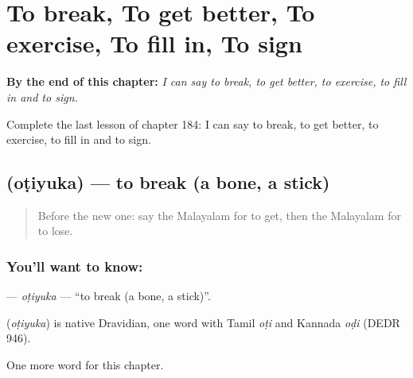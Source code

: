 
\chapter{To break, To get better, To exercise, To fill in, To sign}
\label{ch:ml-to-break-to-get-better-to-exercise-to-fill-in-to-sign}

\begin{chapteropening}
\textbf{By the end of this chapter:} \emph{I can say to break, to get better, to exercise, to fill in and to sign.}

Complete the last lesson of chapter 184: I can say to break, to get better, to exercise, to fill in and to sign.
\end{chapteropening}

\section[\texorpdfstring{\ml{ഒടിയുക} (oṭiyuka)}{ഒടിയുക (oṭiyuka)}]{ (oṭiyuka) — to break (a bone, a stick)}

\label{lesson:ML-C184-otiyuka}



\begin{quote}
Before the new one: say the Malayalam for to get, then the Malayalam for to lose.
\end{quote}

\subsection*{You'll want to know: }
\textbf{} — \emph{oṭiyuka} — \textquotedblleft{}to break (a bone, a stick)\textquotedblright{}.

\begin{cousinweb}
\textbf{} (\emph{oṭiyuka}) is native Dravidian, one word with Tamil \emph{oṭi} and Kannada \emph{oḍi} (DEDR 946).
\end{cousinweb}

\begin{grammarlens}[title={What you've built}]
One more word for this chapter.
\end{grammarlens}

